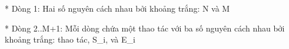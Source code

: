 * Dòng 1: Hai số nguyên cách nhau bởi khoảng trắng: N và M  

   * Dòng 2..M+1: Mỗi dòng chứa một thao tác với ba số nguyên cách nhau bởi khoảng trắng: thao tác, S\_i, và E\_i  

\